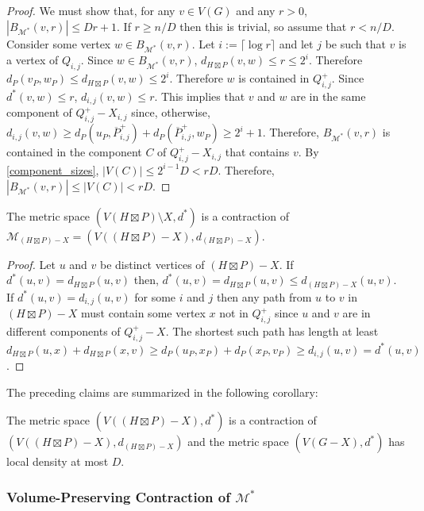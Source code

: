 \documentclass{patmorin}
\renewcommand{\ge}{\geqslant}
\renewcommand{\le}{\leqslant}
\begin{document}
\begin{proof}
  We must show that, for any $v\in V(G)$ and any $r>0$, $|B_{\mathcal{M}^*}(v,r)|\le Dr+1$.  If $r\ge n/D$ then this is trivial, so assume that $r< n/D$.  Consider some vertex $w\in B_{\mathcal{M}^*}(v,r)$.  Let $i:=\lceil\log r\rceil$ and let $j$ be such that $v$ is a vertex of $Q_{i,j}$.  Since $w\in B_{\mathcal{M}^*}(v,r)$, $d_{H\boxtimes P}(v,w)\le r\le 2^i$.  Therefore $d_P(v_P,w_P)\le d_{H\boxtimes P}(v,w)\le 2^i$.  Therefore $w$ is contained in $Q^+_{i,j}$.  Since $d^*(v,w)\le r$, $d_{i,j}(v,w)\le r$.  This implies that $v$ and $w$ are in the same component of $Q^+_{i,j}-X_{i,j}$ since, otherwise, $d_{i,j}(v,w)\ge d_P(u_P,\overline{P}^+_{i,j}) + d_P(\overline{P}^+_{i,j},w_P)\ge 2^i+1$.
  Therefore, $B_{\mathcal{M}^*}(v,r)$ is contained in the component $C$ of $Q^+_{i,j}-X_{i,j}$ that contains $v$.  By \cref{component_sizes}, $|V(C)|\le 2^{i-1}D< rD$.  Therefore, $|B_{\mathcal{M}^*}(v,r)|\le |V(C)|< rD$.
\end{proof}

\begin{clm}
  The metric space $(V(H\boxtimes P)\setminus X,d^*)$ is a contraction of $\mathcal{M}_{(H\boxtimes P)-X}=(V((H\boxtimes P)-X),d_{(H\boxtimes P)-X})$.
\end{clm}

\begin{proof}
  Let $u$ and $v$ be distinct vertices of $(H\boxtimes P)-X$.  If $d^*(u,v)=d_{H\boxtimes P}(u,v)$ then, $d^*(u,v)=d_{H\boxtimes P}(u,v)\le d_{(H\boxtimes P)-X}(u,v)$.  If $d^*(u,v)=d_{i,j}(u,v)$ for some $i$ and $j$ then any path from $u$ to $v$ in $(H\boxtimes P)-X$ must contain some vertex $x$ not in $Q^+_{i,j}$ since $u$ and $v$ are in different components of $Q^+_{i,j}-X$.  The shortest such path has length at least $d_{H\boxtimes P}(u,x)+d_{H\boxtimes P}(x,v) \ge d_P(u_P,x_P)+d_P(x_P,v_P) \ge d_{i,j}(u,v)=d^*(u,v)$.
\end{proof}

The preceding claims are summarized in the following corollary:

\begin{cor}\label{d_star_summary}
  The metric space $(V((H\boxtimes P)-X), d^*)$ is a  contraction of $(V((H\boxtimes P)-X), d_{(H\boxtimes P)-X})$ and the metric space $(V(G-X),d^*)$ has local density at most $D$.
\end{cor}



\subsubsection{Volume-Preserving Contraction of \texorpdfstring{$\mathcal{M}^*$}{M*}}
\end{document}
